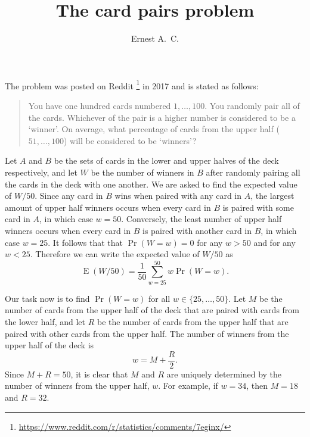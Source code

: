 \documentclass[a4paper,12pt]{article}
\DeclareMathOperator*{\E}{E}
\begin{document}
\title{The card pairs problem}
\author{Ernest A.\ C.}

\maketitle

The problem was posted on Reddit%
\footnote{\url{https://www.reddit.com/r/statistics/comments/7eginx/}}
in 2017 and is stated as follows:
\begin{quote}
  You have one hundred cards numbered $1,\dotsc,100$. You randomly
  pair all of the cards. Whichever of the pair is a higher number is
  considered to be a ‘winner’. On average, what percentage of cards
  from the upper half ($51,\dotsc,100$) will be considered to be
  ‘winners’?
\end{quote}



Let $A$ and $B$ be the sets of cards in the lower and upper halves of
the deck respectively, and let $W$ be the number of winners in $B$
after randomly pairing all the cards in the deck with one another.  We
are asked to find the expected value of $W / 50$.  Since any card in
$B$ wins when paired with any card in $A$, the largest amount of upper
half winners occurs when every card in $B$ is paired with some card in
$A$, in which case $w = 50$.  Conversely, the least number of upper
half winners occurs when every card in $B$ is paired with another card
in $B$, in which case $w = 25$.  It follows that that $\Pr(W=w) = 0$
for any $w > 50$ and for any $w < 25$.  Therefore we can write the
expected value of $W / 50$ as
\begin{equation}
  \label{eq:expected-value}
  \E(W/50) = \frac{1}{50} \sum_{w=25}^{50} w \Pr(W=w) .
\end{equation}

Our task now is to find $\Pr(W=w)$ for all $w \in \{25,\dotsc,50 \}$.
Let $M$ be the number of cards from the upper half of the deck that
are paired with cards from the lower half, and let $R$ be the number
of cards from the upper half that are paired with other cards from the
upper half.  The number of winners from the upper half of the deck is
\begin{equation*}
  w = M + \frac{R}{2} .
\end{equation*}
Since $M + R = 50$, it is clear that $M$ and $R$ are uniquely
determined by the number of winners from the upper half, $w$.  For
example, if $w = 34$, then $M = 18$ and $R = 32$.
\end{document}
